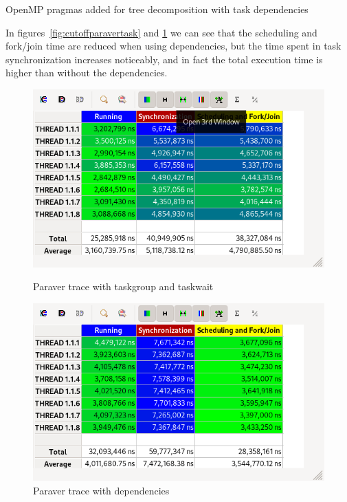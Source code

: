 \begin{listing}[H]
\inputminted[firstline=32,lastline=71]{c}{sources/multisort-omp-tree-depen.c}
\caption{OpenMP pragmas added for tree decomposition with task dependencies}
\label{listing:omp_tree_depen}
\end{listing}

In figures~\ref{fig:cutoffparavertask} and \ref{fig:cutoffparaverdep} we can see that
the scheduling and fork/join time are reduced when using dependencies, but the time spent in task
synchronization increases noticeably, and in fact the total execution time is higher than without the
dependencies.

\begin{figure}[H]
    \begin{minipage}{0.5\textwidth}
        \centering
        \includegraphics[width=\linewidth]{captures/paraver_sync_vanila.png}
        \caption{Paraver trace with taskgroup and taskwait}
        \label{fig:cutoffparavertask} 
    \end{minipage}
    \begin{minipage}{0.5\textwidth}
        \centering
        \includegraphics[width=\linewidth]{captures/paraver_sync_depen.png}
        \caption{Paraver trace with dependencies}
        \label{fig:cutoffparaverdep} 
    \end{minipage}
\end{figure}


